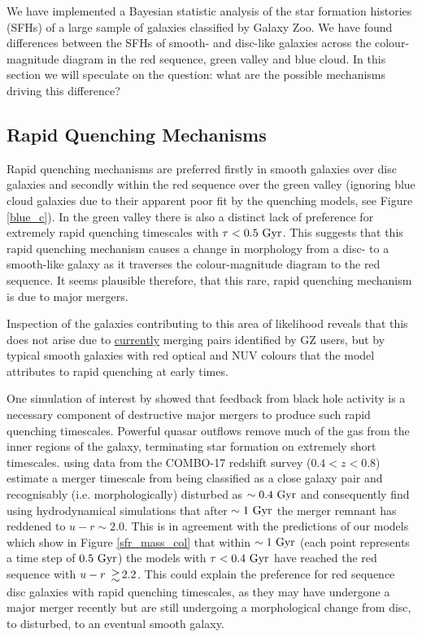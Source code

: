 \documentclass[useAMS,usenatbib]{mn2e}
\def\changed    {\color{titlecol} }
\begin{document}
We have implemented a Bayesian statistic analysis of the star formation histories (SFHs) of a large sample of galaxies classified by Galaxy Zoo. We have found differences between the SFHs of smooth- and disc-like galaxies across the colour-magnitude diagram in the red sequence, green valley and blue cloud. In this section we will speculate on the question: what are the possible mechanisms driving this difference? 

\subsection{Rapid Quenching Mechanisms}\label{rapid}

{\changed Rapid quenching mechanisms are preferred firstly in smooth galaxies over disc galaxies and secondly within the red sequence over the green valley (ignoring blue cloud galaxies due to their apparent poor fit by the quenching models, see Figure \ref{blue_c}). In the green valley there is also a distinct lack of preference for extremely rapid quenching timescales with $\tau < 0.5~\rm{Gyr}$.} This suggests that this rapid quenching mechanism causes a change in morphology from a disc- to a smooth-like galaxy as it traverses the colour-magnitude diagram to the red sequence. It seems plausible therefore, that this rare, rapid quenching mechanism is due to major mergers.


Inspection of the galaxies contributing to this area of likelihood reveals that this does not arise due to \underline{currently} merging pairs identified by GZ users, but by typical smooth galaxies with red optical and NUV colours that the model attributes to rapid quenching at early times.

One simulation of interest by \citet{Springel05} showed that feedback from black hole activity is a necessary component of destructive major mergers to produce such rapid quenching timescales. Powerful quasar outflows remove much of the gas from the inner regions of the galaxy, terminating star formation on extremely short timescales. \citet{Bell06} using data from the COMBO-17 redshift survey ($0.4 < z < 0.8$) estimate a merger timescale from being classified as a close galaxy pair and recognisably (i.e. morphologically) disturbed as $\sim 0.4~\rm{Gyr}$ and \citet{Springel05} consequently find using hydrodynamical simulations that after $\sim1~\rm{Gyr}$ the merger remnant has reddened to $u-r \sim 2.0$. This is in agreement with the predictions of our models which show in Figure \ref{sfr_mass_col} that within $\sim1~\rm{Gyr}$ (each point represents a time step of $0.5~\rm{Gyr}$) the models with $\tau < 0.4~\rm{Gyr}$ have reached the red sequence with $u-r ~\ga 2.2$. {\changed This could explain the preference for red sequence disc galaxies with rapid quenching timescales, as they may have undergone a major merger recently but are still undergoing a morphological change from disc, to disturbed, to an eventual smooth galaxy.} 
\end{document}
